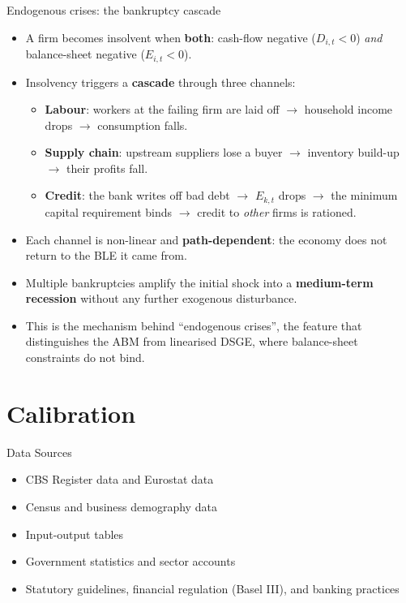 \documentclass[9pt]{beamer}
\begin{document}
\begin{frame}{Endogenous crises: the bankruptcy cascade}
    \begin{itemize}
        \item A firm becomes insolvent when \textbf{both}: cash-flow negative ($D_{i,t} < 0$) \emph{and} balance-sheet negative ($E_{i,t} < 0$).
        \item Insolvency triggers a \textbf{cascade} through three channels:
        \begin{itemize}\footnotesize
            \item \textbf{Labour}: workers at the failing firm are laid off $\to$ household income drops $\to$ consumption falls.
            \item \textbf{Supply chain}: upstream suppliers lose a buyer $\to$ inventory build-up $\to$ their profits fall.
            \item \textbf{Credit}: the bank writes off bad debt $\to$ $E_{k,t}$ drops $\to$ the minimum capital requirement binds $\to$ credit to \emph{other} firms is rationed.
        \end{itemize}
        \item Each channel is non-linear and \textbf{path-dependent}: the economy does not return to the BLE it came from.
        \item Multiple bankruptcies amplify the initial shock into a \textbf{medium-term recession} without any further exogenous disturbance.
        \item This is the mechanism behind ``endogenous crises'', the feature that distinguishes the ABM from linearised DSGE, where balance-sheet constraints do not bind.
    \end{itemize}
\end{frame}



\section{Calibration}
\begin{frame}{Data Sources}
    \begin{itemize}
        \item CBS Register data and Eurostat data
        \item Census and business demography data
        \item Input-output tables
        \item Government statistics and sector accounts
        \item Statutory guidelines, financial regulation (Basel III), and banking practices
    \end{itemize}
\end{frame}
\end{document}
